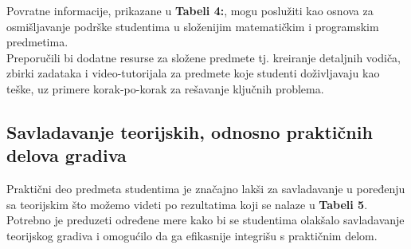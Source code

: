 \documentclass[a4paper]{article}
\begin{document}
Povratne informacije, prikazane u \textbf{Tabeli 4:}, mogu poslužiti kao osnova za osmišljavanje podrške studentima u složenijim matematičkim i programskim predmetima.\\
Preporučili bi dodatne resurse za složene predmete tj. kreiranje detaljnih vodiča, zbirki zadataka i video-tutorijala za predmete koje studenti doživljavaju kao teške, uz primere korak-po-korak za rešavanje ključnih problema.\\

\captionsetup[table]{skip=10pt}
\begin{table}[H]
\caption{Najlakši (matematički i programerski) predmeti u prvoj godini}
\centering %
\end{table}


\subsection{\textbf{Savladavanje teorijskih, odnosno praktičnih delova gradiva}}

Praktični deo predmeta studentima je značajno lakši za savladavanje u poređenju sa teorijskim što možemo videti po rezultatima koji se nalaze u \textbf{Tabeli 5}. Potrebno je preduzeti određene mere kako bi se studentima olakšalo savladavanje teorijskog gradiva i omogućilo da ga efikasnije integrišu s praktičnim delom.\\
\end{document}
